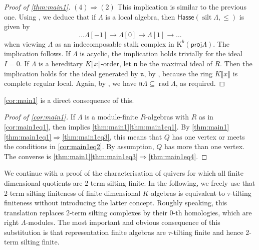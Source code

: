 \documentclass[11pt]{amsart}
\newcommand{\proj}{\mathsf{proj}}
\newcommand{\Hasse}{\mathsf{Hasse}}
\DeclareMathOperator{\rad}{\mathrm{rad}}
\DeclareMathOperator{\silt}{\mathrm{silt}}
\theoremstyle{definition}
\begin{document}
\begin{proof}[Proof of \cref{thm:main1}]
     $(4) \Rightarrow (2)$ This implication is similar to the previous one. Using \cite[Thm. 2.26]{Aihara_2012}, we deduce that if $\Lambda$ is a local algebra, then $\Hasse(\silt \Lambda, \leq)$ is given by
     \[ \dots \Lambda[-1] \to \Lambda[0] \to \Lambda[1] \to \dots \]
     when viewing $\Lambda$ as an indecomposable stalk complex in $\mathrm{K}^b(\proj \Lambda)$. The implication follows. If $\Lambda$ is acyclic, the implication holds trivially for the ideal $I= 0$. If $\Lambda$ is a hereditary $K \llbracket x \rrbracket$-order, let $\mathfrak{n}$ be the maximal ideal of $R$. Then the implication holds for the ideal generated by $\mathfrak{n}$, by \cite[Thm. A]{Gnedin2022}, because the ring $K \llbracket x \rrbracket$ is complete regular local. Again, by \cite[Prop. 5.22]{CurtisReiner1981}, we have $\mathfrak{n} \Lambda \subseteq \rad \Lambda$, as required.
        \end{proof}
        
        \cref{cor:main1} is a direct consequence of this.
    
    
    \begin{proof}[Proof of \cref{cor:main1}]
    	If $\Lambda$ is a module-finite $R$-algebras with $R$ as in \eqref{cor:main1eq1}, then \cite[Thm. 4.3]{Kimura2024} implies \cref{thm:main1}\eqref{thm:main1eq1}. By \cref{thm:main1}\eqref{thm:main1eq1}$\Rightarrow$\eqref{thm:main1eq3}, this means that $Q$ has one vertex or meets the conditions in \eqref{cor:main1eq2}. By assumption, $Q$ has more than one vertex. The converse is \cref{thm:main1}\eqref{thm:main1eq3}$\Rightarrow$\eqref{thm:main1eq4}.
    \end{proof}
    

We continue with a proof of the characterisation of quivers for which all finite dimensional quotients are 2-term silting finite. In the following, we freely use that 2-term silting finiteness of finite dimensional $K$-algebras is equivalent to $\tau$-tilting finiteness \cite[Thm. 0.5]{tau} without introducing the latter concept. Roughly speaking, this translation replaces 2-term silting complexes by their $0$-th homologies, which are right $\Lambda$-modules. The most important and obvious consequence of this substitution is that representation finite algebras are $\tau$-tilting finite and hence 2-term silting finite.
\end{document}
